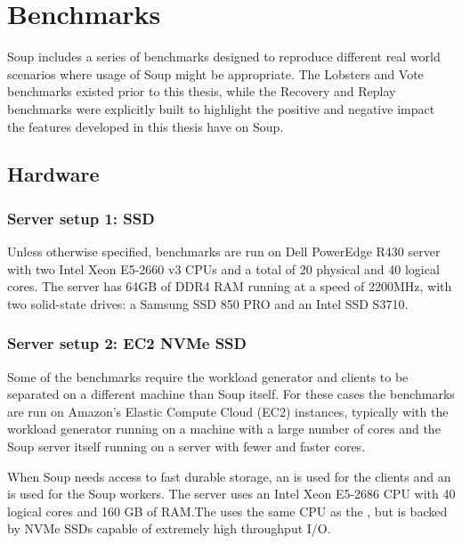\chapter{Benchmarks}\label{chap:benchmarks}

Soup includes a series of benchmarks designed to reproduce different real world
scenarios where usage of Soup might be appropriate. The Lobsters and Vote
benchmarks existed prior to this thesis, while the Recovery and Replay
benchmarks were explicitly built to highlight the positive and negative impact
the features developed in this thesis have on Soup.

\newpage

\section{Hardware}

\subsection{Server setup 1: SSD}

Unless otherwise specified, benchmarks are run on Dell PowerEdge R430 server
with two Intel Xeon E5-2660 v3 CPUs and a total of 20 physical and 40 logical
cores. The server has 64GB of DDR4 RAM running at a speed of 2200MHz, with two
solid-state drives: a Samsung SSD 850 PRO and an Intel SSD S3710.

\subsection{Server setup 2: EC2 NVMe SSD}

Some of the benchmarks require the workload generator and clients to be
separated on a different machine than Soup itself. For these cases the
benchmarks are run on Amazon's Elastic Compute Cloud (EC2)
instances, typically with the
workload generator running on a machine with a large number of cores and the
Soup server itself running on a server with fewer and faster cores.

When Soup needs access to fast durable storage, an  is used
for the clients and an  is used for the Soup workers. The
 server uses an Intel Xeon E5-2686 CPU with 40 logical cores
and 160 GB of RAM.\@ The  uses the same CPU as the ,
but is backed by NVMe SSDs capable of extremely high throughput I/O.

